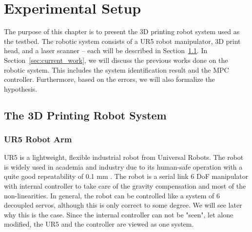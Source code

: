 \chapter{Experimental Setup} \label{chap:testbed}

The purpose of this chapter is to present the \acs{3D} printing robot system used as the testbed. The robotic system consists of a UR5 robot manipulator, \acs{3D} print head, and a laser scanner -- each will be described in Section~\ref{sec:ur5}. In Section~\ref{sec:current_work}, we will discuss the previous works done on the robotic system. This includes the system identification result and the \ac {MPC} controller. Furthermore, based on the errors, we will also formalize the hypothesis.
\section{The 3D Printing Robot System} \label{sec:ur5}
\subsection{UR5 Robot Arm} \label{subsec:ur5}
UR5 is a lightweight, flexible industrial robot from Universal Robots. The robot is widely used in academia and industry due to its human-safe operation with a quite good repeatability of 0.1 mm \cite{UR5} \cite{6942896}. The robot is a serial link 6 \acs{DoF} manipulator with internal controller to take care of the gravity compensation and most of the non-linearities. In general, the robot can be controlled like a system of 6 decoupled servos, although this is only correct to some degree. We will see later why this is the case. Since the internal controller can not be "seen", let alone modified, the UR5 and the controller are viewed as one system. 

